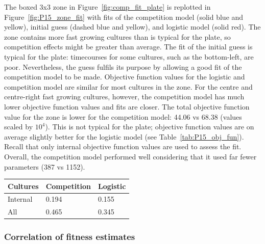 \begin{multicols}{2}
The boxed 3x3 zone in Figure~\ref{fig:comp_fit_plate} is replotted in
Figure~\ref{fig:P15_zone_fit} with fits of the competition model
(solid blue and yellow), initial guess (dashed blue and yellow), and
logistic model (solid red). The zone contains more fast growing
cultures than is typical for the plate, so competition effects might
be greater than average.
The fit of the initial guess is typical for the plate: timecourses for
some cultures, such as the bottom-left, are poor. Nevertheless, the
guess fulfils its purpose by allowing a good fit of the competition
model to be made. Objective function values for the logistic and
competition model are similar for most cultures in the zone. For the
centre and centre-right fast growing cultures, however, the
competition model has much lower objective function values and fits
are closer. The total objective function value for the zone is lower
for the competition model: 44.06 vs 68.38 (values scaled by
\(10^{4}\)). This is not typical for the plate; objective function
values are on average slightly better for the logistic model (see
Table~\ref{tab:P15_obj_fun}). Recall that only internal objective
function values are used to assess the fit. Overall, the competition
model performed well considering that it used far fewer parameters
(387 vs 1152).
\begin{center}
  \begin{tabular}{l l l}
    \hline
    Cultures     & Competition & Logistic \\
    \hline
    Internal     & 0.194    & 0.155\\
    All          & 0.465    & 0.345\\
    \hline
  \end{tabular}
  \label{tab:P15_obj_fun}
\end{center}

\subsubsection{\boldmath Correlation of fitness estimates \unboldmath}
\label{sec:correlation}


\end{multicols}

